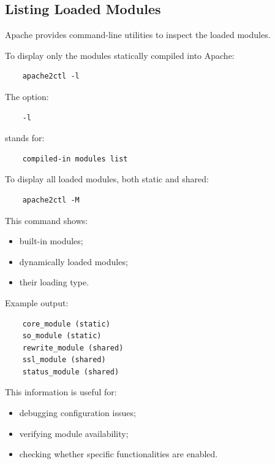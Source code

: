 \documentclass{scrbook}
\begin{document}
	\subsection{Listing Loaded Modules}
	
	Apache provides command-line utilities to inspect the loaded modules.
	
	To display only the modules statically compiled into Apache:
	
	\begin{lstlisting}
	apache2ctl -l
	\end{lstlisting}
	
	The option:
	
	\begin{lstlisting}
	-l
	\end{lstlisting}
	
	stands for:
	\begin{lstlisting}
	compiled-in modules list
	\end{lstlisting}
	
	To display all loaded modules, both static and shared:
	
	\begin{lstlisting}
	apache2ctl -M
	\end{lstlisting}
	
	This command shows:
	\begin{itemize}
		\item built-in modules;
		
		\item dynamically loaded modules;
		
		\item their loading type.
	\end{itemize}
	
	Example output:
	
	\begin{lstlisting}
	core_module (static)
	so_module (static)
	rewrite_module (shared)
	ssl_module (shared)
	status_module (shared)
	\end{lstlisting}
	
	This information is useful for:
	\begin{itemize}
		\item debugging configuration issues;
		
		\item verifying module availability;
		
		\item checking whether specific functionalities are enabled.
	\end{itemize}
	
\end{document}
